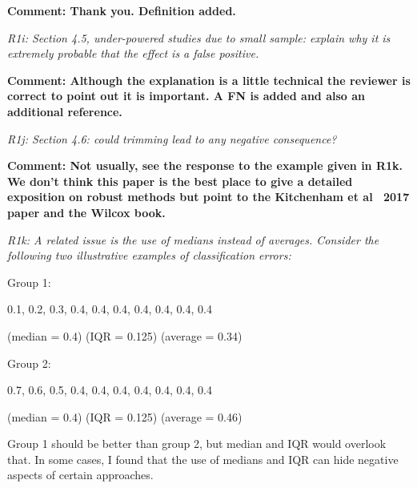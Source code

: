 {\bf Comment: Thank you.  Definition added.
}




{\em R1i: Section 4.5, under-powered studies due to small sample: explain why it is extremely probable that the effect is a false positive. }

{\bf Comment: Although the explanation is a little technical the reviewer is correct to point out it is important.  A FN is added and also an additional reference.}


{\em R1j:  Section 4.6: could trimming lead to any negative consequence?}

{\bf Comment: Not usually, see the response to the example given in R1k. We don't think this paper is the best place to give a detailed exposition on robust methods but point to the Kitchenham et al~ 2017 paper and the Wilcox book.
}

{\em R1k:  A related issue is the use of medians instead of averages. Consider the following two illustrative examples of classification errors:

Group 1: 

0.1, 0.2, 0.3, 0.4, 0.4, 0.4, 0.4, 0.4, 0.4, 0.4

(median = 0.4)
(IQR = 0.125)
(average = 0.34)

Group 2:

0.7, 0.6, 0.5, 0.4, 0.4, 0.4, 0.4, 0.4, 0.4, 0.4

(median = 0.4)
(IQR = 0.125)
(average = 0.46)

Group 1 should be better than group 2, but median and IQR would overlook that. In some cases, I found that the use of medians and IQR can hide negative aspects of certain approaches. }

